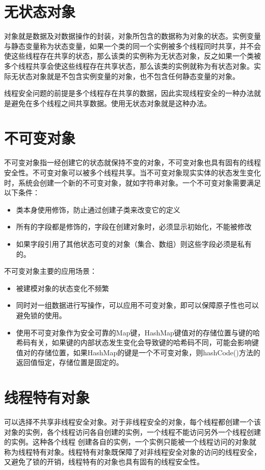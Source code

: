 \documentclass[a4paper]{report}
\begin{document}
\section{无状态对象}
对象就是数据及对数据操作的封装，对象所包含的数据称为对象的状态。实例变量与静态变量称为状态变量，如果一个类的同一个实例被多个线程同时共享，并不会使这些线程存在共享的状态，那么该类的实例称为无状态对象，反之如果一个类被多个线程共享会使这些线程存在共享状态，那么该类的实例就称为有状态对象。实际无状态对象就是不包含实例变量的对象，也不包含任何静态变量的对象。

线程安全问题的前提是多个线程存在共享的数据，因此实现线程安全的一种办法就是避免在多个线程之间共享数据。使用无状态对象就是这种办法。
\section{不可变对象}
不可变对象指一经创建它的状态就保持不变的对象，不可变对象也具有固有的线程安全性。不可变对象可以被多个线程共享。当不可变对象现实实体的状态发生变化时，系统会创建一个新的不可变对象，就如字符串对象。一个不可变对象需要满足以下条件：
\begin{itemize}
  \item 类本身使用修饰，防止通过创建子类来改变它的定义
  \item 所有的字段都是修饰的，字段在创建对象时，必须显示初始化，不能被修改
  \item 如果字段引用了其他状态可变的对象（集合、数组）则这些字段必须是私有的。
\end{itemize}
不可变对象主要的应用场景：
\begin{itemize}
  \item 被建模对象的状态变化不频繁
  \item 同时对一组数据进行写操作，可以应用不可变对象，即可以保障原子性也可以避免锁的使用。
  \item 使用不可变对象作为安全可靠的Map键，HashMap键值对的存储位置与键的哈希码有关，如果键的内部状态发生变化会导致键的哈希码不同，可能会影响键值对的存储位置，如果HashMap的键是一个不可变对象，则hashCode()方法的返回值恒定，存储位置是固定的。
\end{itemize}
\section{线程特有对象}
可以选择不共享非线程安全对象。对于非线程安全的对象，每个线程都创建一个该对象的实例，各个线程访问各自创建的实例，一个线程不能访问另外一个线程创建的实例。这种各个线程 创建各自的实例，一个实例只能被一个线程访问的对象就称为线程特有对象。线程特有对象既保障了对非线程安全对象的访问的线程安全，又避免了锁的开销，线程特有的对象也具有固有的线程安全性。
\end{document}
